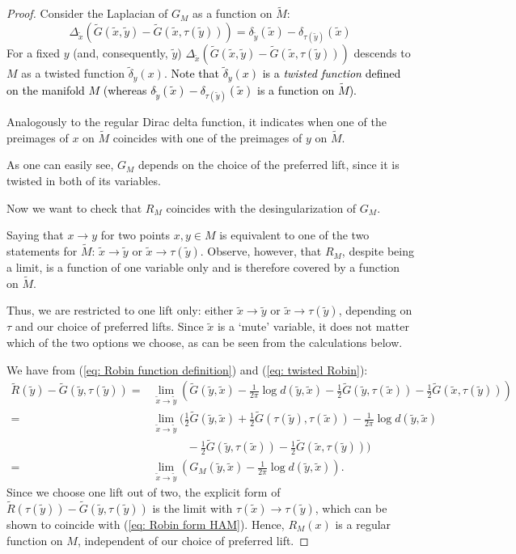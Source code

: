 \documentclass[11pt,twoside]{article}
\theoremstyle{definition}
\numberwithin{equation}{section}
\def\Mt{\widetilde{M}}
\def\Gt{\widetilde{G}}
\def\Rt{\widetilde{R}}
\def\xt{\tilde{x}}
\def\yt{\tilde{y}}
\begin{document}
\begin{proof}


Consider the Laplacian of $G_M$ as a function on $\Mt$:
\[
\Delta_{\xt}\left( \Gt(\xt,\yt) -\Gt(\xt,\tau(\yt))\right) = \delta_{\yt}(\xt) - \delta_{\tau(\yt)}(\xt)  
\]
For a fixed $y$ (and, consequently, $\yt$) $\Delta_{\xt}\left(\Gt(\xt,\yt) -\Gt(\xt,\tau(\yt))\right)$ descends to $M$ as a twisted function $\widetilde{\delta}_y(x)$. \textcolor{black}{Note that $\widetilde{\delta}_y(x)$ is a \textit{twisted function} defined on the manifold $M$ (whereas $\delta_{\yt}(\xt) - \delta_{\tau(\yt)}(\xt)$ is a function on $\Mt$).} 

Analogously to the regular Dirac delta function, it indicates when one of the preimages of $x$ on $\Mt$ coincides with one of the preimages of $y$ on $\Mt$.  

As one can easily see, $G_M$ depends on the choice of the preferred lift, since it is twisted in both of its variables. 

Now we want to check that $R_M$ coincides with the desingularization of $G_M$.

Saying  that $x\to y$ for two points $x,y\in M$ is equivalent to one of the two statements for $\Mt$: $\xt\to \yt$ or $\xt\to \tau(\yt)$. Observe, however, that  $R_M$, despite being a limit, is a function of one variable only and is therefore covered by a function on $\Mt$. 

 Thus, we are restricted to one lift only: either $\xt\to \yt$ or $\xt\to \tau(\yt)$, depending on $\tau$ and our choice of preferred lifts. Since $\xt$ is a `mute' variable, it does not matter which of the two options we choose, as can be seen from the calculations  below.






We have from (\ref{eq: Robin function definition}) and (\ref{eq: twisted Robin}):
\begin{equation}
\label{eq: Robin form HAM}
    \begin{split}
        \Rt(\yt)- \Gt(\yt,\tau(\yt)) 
        =& \lim_{\xt\to \yt}\left(\Gt(\yt,\xt) -\frac{1}{2\pi}\log d(\yt,\xt)  - \frac12\Gt(\yt, \tau(\xt))  - \frac12\Gt(\xt,\tau(\yt))\right)  \\ =&\lim_{\xt\to \yt}\biggl(\frac12\Gt(\yt,\xt) + \frac12\Gt(\tau(\yt),\tau(\xt))-\frac{1}{2\pi}\log d(\yt,\xt)  \\& \qquad\quad -\frac12\Gt(\yt, \tau(\xt))  - \frac12\Gt(\xt,\tau(\yt))\biggr)  \\ =&\lim_{\xt\to \yt}\left(G_M(\yt,\xt) -\frac{1}{2\pi}\log d(\yt,\xt) \right).
    \end{split}
\end{equation}
Since we choose one lift out of two, the 
explicit form of $\Rt(\tau(\yt)) - \Gt(\yt,\tau(\yt))$  is the limit with $\tau(\xt)\to\tau(\yt)$, which can be shown to coincide with (\ref{eq: Robin form HAM}). Hence, $R_M(x)$ is a regular function on $M$, independent of our choice of preferred lift.
\end{proof}
\end{document}
